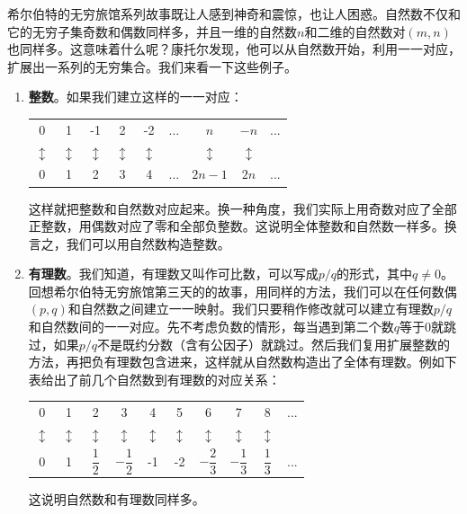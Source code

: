\documentclass{article}
\begin{document}
希尔伯特的无穷旅馆系列故事既让人感到神奇和震惊，也让人困惑。自然数不仅和它的无穷子集奇数和偶数同样多，并且一维的自然数$n$和二维的自然数对$(m, n)$也同样多。这意味着什么呢？康托尔发现，他可以从自然数开始，利用一一对应，扩展出一系列的无穷集合。我们来看一下这些例子。

\begin{enumerate}
\item \textbf{整数}。如果我们建立这样的一一对应：

\begin{tabular}{ccccccccc}
0 & 1 & -1 & 2 & -2 & ... & $n$ & $-n$ & ... \\
$\updownarrow$ & $\updownarrow$ & $\updownarrow$ & $\updownarrow$ & $\updownarrow$ & & $\updownarrow$ & $\updownarrow$ & \\
0 & 1 &  2 & 3 &  4 & ... & $2n - 1$ & $2n$ & ... \\
\end{tabular}

这样就把整数和自然数对应起来。换一种角度，我们实际上用奇数对应了全部正整数，用偶数对应了零和全部负整数。这说明全体整数和自然数一样多。换言之，我们可以用自然数构造整数。
\item \textbf{有理数}。我们知道，有理数又叫作可比数，可以写成$p/q$的形式，其中$q \neq 0$。回想希尔伯特无穷旅馆第三天的的故事，用同样的方法，我们可以在任何数偶$(p, q)$和自然数之间建立一一映射。我们只要稍作修改就可以建立有理数$p/q$和自然数间的一一对应。先不考虑负数的情形，每当遇到第二个数$q$等于0就跳过，如果$p/q$不是既约分数（含有公因子）就跳过。然后我们复用扩展整数的方法，再把负有理数包含进来，这样就从自然数构造出了全体有理数。例如下表给出了前几个自然数到有理数的对应关系：

\begin{tabular}{cccccccccc}
0 & 1 & 2 & 3 & 4 & 5 & 6 & 7 & 8 & ... \\
$\updownarrow$ & $\updownarrow$ & $\updownarrow$ & $\updownarrow$ & $\updownarrow$ & $\updownarrow$ & $\updownarrow$ & $\updownarrow$ & $\updownarrow$ & \\
0 & 1 & $\dfrac{1}{2}$ & $-\dfrac{1}{2}$ & -1 & -2 & $-\dfrac{2}{3}$ & $-\dfrac{1}{3}$ & $\dfrac{1}{3}$ & ... \\
\end{tabular}

这说明自然数和有理数同样多。


\end{enumerate}
\end{document}
